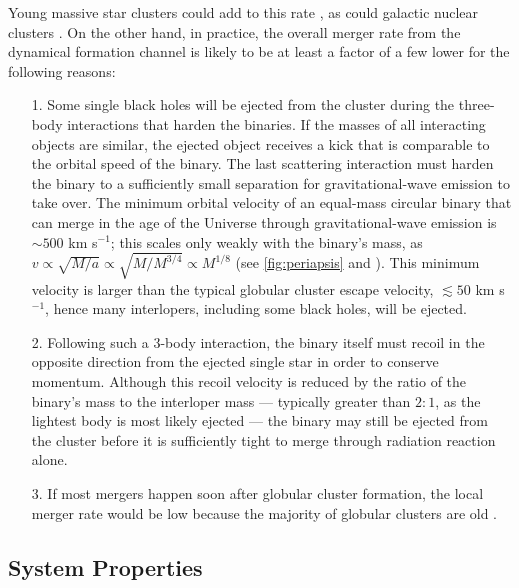 \documentclass[review]{elsarticle}
\begin{document}
Young massive star clusters could add to this rate \citep[e.g.,][]{Ziosi:2014,Kumamoto:2020,Santoliquido:2020,Banerjee:2021}, as could galactic nuclear clusters \citep[e.g.,][]{MillerLauburg:2008,AntoniniRasio:2016,Hoang:2018,Stephan:2019,Grobner:2020,Tagawa:2020}.  On the other hand, in practice, the overall merger rate from the dynamical formation channel is likely to be at least a factor of a few lower for the following reasons:
\begin{enumerate}
	\item [1.]
Some single black holes will be ejected from the cluster during the three-body interactions that harden the binaries.  If the masses of all interacting objects are similar, the ejected object receives a kick that is comparable to the orbital speed of the binary.  The last scattering interaction must harden the binary to a sufficiently small separation for gravitational-wave emission to take over. The minimum orbital velocity of an equal-mass circular binary that can merge in the age of the Universe through gravitational-wave emission is $\sim 500$ km s$^{-1}$; this scales only weakly with the binary's mass, as $v \propto \sqrt{M/a}  \propto \sqrt{M/M^{3/4}} \propto M^{1/8}$ (see \autoref{fig:periapsis} and \citet{Peters:1964}).   This minimum velocity is larger than the typical globular cluster escape velocity, $\lesssim 50$ km s$^{-1}$, hence many interlopers, including some black holes, will be ejected.
	\item[2.]
Following such a 3-body interaction, the binary itself must recoil in the opposite direction from the ejected single star in order to conserve momentum. Although this recoil velocity is reduced by the ratio of the binary's mass to the interloper mass --- typically greater than $2:1$, as the lightest body is most likely ejected --- the binary may still be ejected from the cluster before it is sufficiently tight to merge through radiation reaction alone.
\item[3.] If most mergers happen soon after globular cluster formation, the local merger rate would be low because the majority of globular clusters are old \citep{Rodriguez:2016big}.
\end{enumerate} 


\subsection{System Properties}
\end{document}

